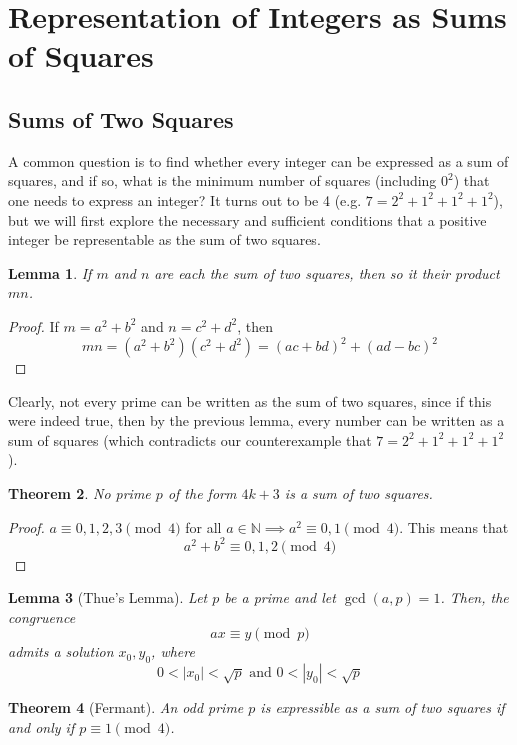 \documentclass{article}
\newtheorem{theorem}{Theorem}[section]
\newtheorem{lemma}[theorem]{Lemma}
\theoremstyle{remark}
\theoremstyle{definition}
\begin{document}
\section{Representation of Integers as Sums of Squares}
\subsection{Sums of Two Squares}
A common question is to find whether every integer can be expressed as a sum of squares, and if so, what is the minimum number of squares (including $0^2$) that one needs to express an integer? It turns out to be 4 (e.g. $7 = 2^2 + 1^2 + 1^2 + 1^2$), but we will first explore the necessary and sufficient conditions that a positive integer be representable as the sum of two squares. 

\begin{lemma}
If $m$ and $n$ are each the sum of two squares, then so it their product $mn$. 
\end{lemma}
\begin{proof}
If $m = a^2 + b^2$ and $n = c^2 + d^2$, then 
\[mn = (a^2 + b^2)(c^2 + d^2) = (ac + bd)^2 + (ad - bc)^2\]
\end{proof}

Clearly, not every prime can be written as the sum of two squares, since if this were indeed true, then by the previous lemma, every number can be written as a sum of squares (which contradicts our counterexample that $7 = 2^2 + 1^2 + 1^2 + 1^2$). 

\begin{theorem}
No prime $p$ of the form $4k + 3$ is a sum of two squares. 
\end{theorem}
\begin{proof}
$a \equiv 0, 1, 2, 3 \pmod{4}$ for all $a \in \mathbb{N} \implies a^2 \equiv 0, 1 \pmod{4}$. This means that 
\[a^2 + b^2 \equiv 0, 1, 2 \pmod{4}\]
\end{proof}

\begin{lemma}[Thue's Lemma]
Let $p$ be a prime and let $\gcd(a, p) = 1$. Then, the congruence
\[a x \equiv y \pmod{p}\]
admits a solution $x_0, y_0$, where
\[0 < |x_0| < \sqrt{p} \text{  and  } 0 < |y_0| < \sqrt{p}\]
\end{lemma}

\begin{theorem}[Fermant]
An odd prime $p$ is expressible as a sum of two squares if and only if $p \equiv 1 \pmod{4}$. 
\end{theorem}
\end{document}
